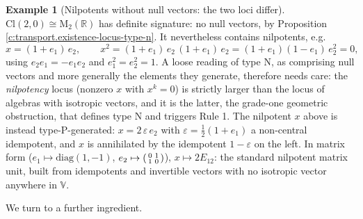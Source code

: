 \documentclass[11pt]{article}
\theoremstyle{definition}
\newtheorem{example}[theorem]{Example}
\theoremstyle{plain}
\providecommand{\Cl}{}\renewcommand{\Cl}{\mathrm{Cl}}
\providecommand{\Mat}{}\renewcommand{\Mat}{\mathrm{M}}
\providecommand{\R}{}\renewcommand{\R}{\mathbb{R}}
\begin{document}
\begin{example}[Nilpotents without null vectors: the two loci differ]\label{c:note.transport.nilpotents-without-null-vectors-two-loci}
$\Cl(2,0) \cong \Mat_2(\R)$ has definite signature: no null vectors, by Proposition \ref{c:transport.existence-locus-type-n}. It nevertheless contains nilpotents, e.g.
\[
x = (1 + e_1)\,e_2, \qquad x^2 = (1+e_1)\,e_2\,(1+e_1)\,e_2 = (1+e_1)(1-e_1)\,e_2^2 = 0,
\]
using $e_2 e_1 = -e_1 e_2$ and $e_1^2 = e_2^2 = 1$. A loose reading of type N, as comprising null vectors and more generally the elements they generate, therefore needs care: the \emph{nilpotency} locus (nonzero $x$ with $x^k = 0$) is strictly larger than the locus of algebras with isotropic vectors, and it is the latter, the grade-one geometric obstruction, that defines type N and triggers Rule 1. The nilpotent $x$ above is instead type-P-generated: $x = 2\,\varepsilon\, e_2$ with $\varepsilon = \tfrac12(1 + e_1)$ a non-central idempotent, and $x$ is annihilated by the idempotent $1 - \varepsilon$ on the left. In matrix form ($e_1 \mapsto \mathrm{diag}(1,-1)$, $e_2 \mapsto \begin{psmallmatrix} 0 & 1 \\ 1 & 0\end{psmallmatrix}$), $x \mapsto 2E_{12}$: the standard nilpotent matrix unit, built from idempotents and invertible vectors with no isotropic vector anywhere in $\mathbb{V}$.
\end{example}

We turn to a further ingredient.
\end{document}
